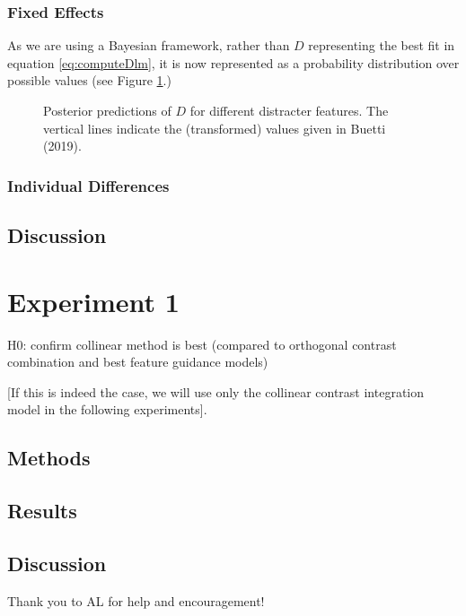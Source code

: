 \documentclass[smallextended]{svjour3}       %
\begin{document}
\subsubsection{Fixed Effects}

As we are using a Bayesian framework, rather than $D$ representing the best fit in equation \ref{eq:computeDlm}, it is now represented as a probability distribution over possible values (see Figure \ref{fig:reanalysisBuetti2019}.)


\begin{figure}
\caption{Posterior predictions of $D$ for different distracter features. The vertical lines indicate the (transformed) values given in Buetti (2019).}
\label{fig:reanalysisBuetti2019}
\end{figure} 

\subsubsection{Individual Differences}

\subsection{Discussion}


\section{Experiment 1}

H0: confirm collinear method is best (compared to orthogonal contrast combination and best feature guidance models)

[If this is indeed the case, we will use only the collinear contrast integration model in the following experiments].

\subsection{Methods}

\subsection{Results}

\subsection{Discussion}



\begin{acknowledgements}
Thank you to AL for help and encouragement! 
\end{acknowledgements}
\end{document}
